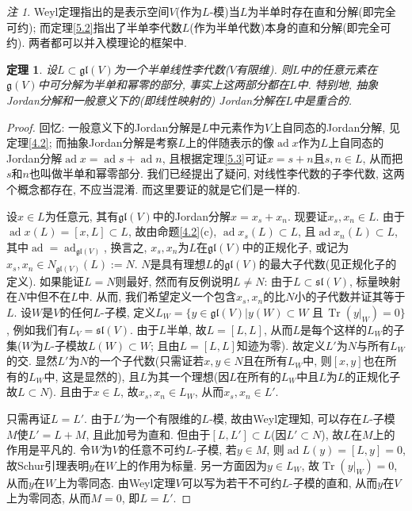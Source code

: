 \documentclass{ctexart}%
\newtheorem{theorem}{定理}
\theoremstyle{definition}
\theoremstyle{remark}
\newtheorem{remark}{注}
\DeclareMathOperator{\ad}{ad}
\DeclareMathOperator{\Tr}{Tr}
\begin{document}
\begin{remark}
Weyl定理指出的是表示空间$V$(作为$L$-模)当$L$为半单时存在直和分解(即完全可约); 而定理\ref{5.2}指出了半单李代数$L$(作为半单代数)本身的直和分解(即完全可约). 两者都可以并入模理论的框架中. 
\end{remark}

\begin{theorem}\label{6.4}
设$L\subset \mathfrak{gl}(V)$为一个半单线性李代数($V$有限维). 则$L$中的任意元素在$\mathfrak{g}(V)$中可分解为半单和幂零的部分, 事实上这两部分都在$L$中. 特别地, 抽象Jordan分解和一般意义下的(即线性映射的) Jordan分解在$L$中是重合的.
\end{theorem}
\begin{proof}
回忆: 一般意义下的Jordan分解是$L$中元素作为$V$上自同态的Jordan分解, 见定理\ref{4.2}; 而抽象Jordan分解是考察$L$上的伴随表示的像$\ad x$作为$L$上自同态的Jordan分解$\ad x=\ad s+\ad n$, 且根据定理\ref{5.3}可证$x=s+n$且$s,n\in L$, 从而把$s$和$n$也叫做半单和幂零部分. 我们已经提出了疑问, 对线性李代数的子李代数, 这两个概念都存在, 不应当混淆. 而这里要证的就是它们是一样的.

设$x\in L$为任意元, 其有$\mathfrak{gl}(V)$中的Jordan分解$x=x_s+x_n$. 现要证$x_s, x_n\in L$. 由于$\ad x(L)=[x,L]\subset L$, 故由命题\ref{4.2}(c), $\ad x_s(L)\subset L$, 且$\ad x_n(L)\subset L$, 其中$\ad = \ad_{\mathfrak{gl}(V)}$, 换言之, $x_s,x_n$为$L$在$\mathfrak{gl}(V)$中的正规化子, 或记为$x_s,x_n \in N_{\mathfrak{gl}(V)}(L):=N$. $N$是具有理想$L$的$\mathfrak{gl}(V)$的最大子代数(见正规化子的定义). 如果能证$L=N$则最好, 然而有反例说明$L\neq N$: 由于$L\subset \mathfrak{sl}(V)$, 标量映射在$N$中但不在$L$中. 从而, 我们希望定义一个包含$x_s, x_n$的比$N$小的子代数并证其等于$L$. 设$W$是$V$的任何$L$-子模, 定义$L_W=\{y\in \mathfrak{gl}(V)|y(W)\subset W\text{ 且}\,\Tr(y|_W)=0\}$, 例如我们有$L_V=\mathfrak{sl}(V)$. 由于$L$半单, 故$L=[L,L]$, 从而$L$是每个这样的$L_W$的子集($W$为$L$-子模故$L(W)\subset W$; 且由$L=[L,L]$知迹为零). 故定义$L'$为$N$与所有$L_W$的交. 显然$L'$为$N$的一个子代数(只需证若$x,y\in N$且在所有$L_W$中, 则$[x,y]$也在所有的$L_W$中, 这是显然的), 且$L$为其一个理想(因$L$在所有的$L_W$中且$L$为$L$的正规化子故$L\subset N$). 且由于$x\in L$, 故$x_s, x_n\in L_W$, 从而$x_s,x_n\in L'$.

只需再证$L=L'$. 由于$L'$为一个有限维的$L$-模, 故由Weyl定理知, 可以存在$L$-子模$M$使$L'=L+M$, 且此加号为直和. 但由于$[L,L']\subset L$(因$L'\subset N$), 故$L$在$M$上的作用是平凡的. 令$W$为$V$的任意不可约$L$-子模, 若$y\in M$, 则$\ad L(y)=[L,y]=0$, 故Schur引理表明$y$在$W$上的作用为标量. 另一方面因为$y\in L_W$, 故$\Tr(y|_W)=0$, 从而$y$在$W$上为零同态. 由Weyl定理$V$可以写为若干不可约$L$-子模的直和, 从而$y$在$V$上为零同态, 从而$M=0$, 即$L=L'$.
\end{proof}
\end{document}
